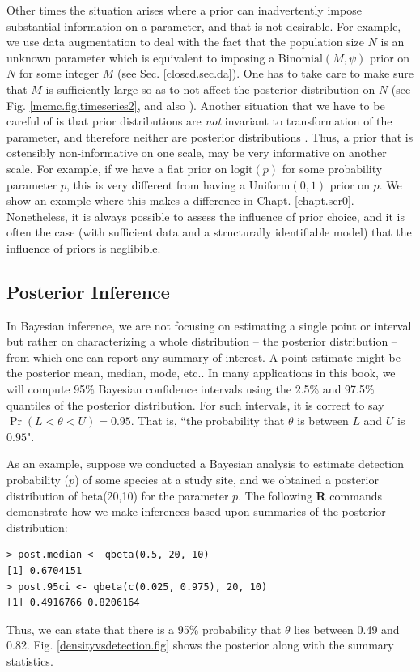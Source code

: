 Other times the situation arises where a prior can inadvertently impose
substantial information on a parameter, and that is not desirable.
For example, we use data augmentation
to deal with the fact that the population size $N$ is an unknown parameter
 \citep{royle_etal:2007} which is equivalent to imposing a $\mbox{Binomial}(M,\psi)$
 prior on $N$ for some integer $M$ (see Sec. \ref{closed.sec.da}). One has to take care to make sure
 that $M$ is sufficiently large so as to not affect the posterior
 distribution on $N$ (see Fig. \ref{mcmc.fig.timeseries2}, and also
 \citet[][Ch. 5]{kery_schaub:2011}).
Another situation that we have
 to be careful of is that
prior 
distributions are {\it not} invariant to transformation of the
parameter,
and therefore neither are posterior distributions
\citep[][Sec. 6.2.1]{link_barker:2010}. Thus, a prior that is ostensibly
non-informative on one scale, may be very informative on another
scale. 
For example, if we have a flat prior on $\mbox{logit}(p)$ for some probability
parameter $p$, this is very different from having a 
$\mbox{Uniform}(0,1)$ prior 
on $p$. We show an example where this makes a difference in
Chapt. \ref{chapt.scr0}. Nonetheless, it is always possible to assess
the influence of prior choice, and it is often the case (with
sufficient data and a structurally identifiable model) that the
influence of priors is neglibible. 

\subsection{Posterior Inference}

In Bayesian inference, we are not focusing on estimating a single
point or interval but rather on characterizing a whole distribution --
the posterior distribution -- from which one can report any summary of
interest. A point estimate might be the posterior mean, median, mode,
etc..  In many applications in this book, we will compute 95\%
Bayesian confidence intervals using the 2.5\% and 97.5\% quantiles of the
posterior distribution. For such intervals, it is correct to say
$\Pr(L < \theta < U) = 0.95$. That is, ``the probability that $\theta$
is between $L$ and $U$ is $0.95$". 

As an
example, suppose we conducted a Bayesian analysis to estimate
detection probability ($p$) of some species at a study site, and we
obtained a posterior distribution of beta(20,10) for the parameter
$p$. The following {\bf R} commands demonstrate how we make inferences based
upon summaries of the posterior distribution:
\begin{verbatim}
> post.median <- qbeta(0.5, 20, 10)
[1] 0.6704151
> post.95ci <- qbeta(c(0.025, 0.975), 20, 10)
[1] 0.4916766 0.8206164
\end{verbatim}
Thus, we can state that there is a 95\% probability that $\theta$ lies
between 0.49 and 0.82. Fig. \ref{densityvsdetection.fig} shows the
posterior along with the summary statistics.

